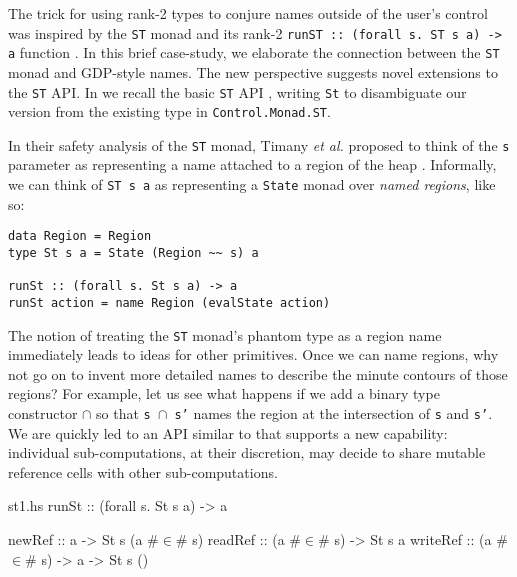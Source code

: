 \documentclass[format=sigplan, review=false, screen=true]{acmart}
\makeatletter
\let\origsection\section
\renewcommand\section{\@ifstar{\starsection}{\nostarsection}}
\newcommand\nostarsection[1]
{\sectionprelude\origsection{#1}\sectionpostlude}
\newcommand\starsection[1]
{\sectionprelude\origsection*{#1}\sectionpostlude}
\newcommand\sectionprelude{%
  \vspace{-0.5em}
}
\newcommand\sectionpostlude{%
  \vspace{0em}
}
\makeatother
\begin{document}

\section{Case Study \#2: Sharing state threads}
The trick for using rank-2 types to conjure names outside of the user's control was
inspired by the \texttt{ST} monad and its rank-2 \texttt{runST :: (forall s. ST s a) -> a}
function \cite{launchbury1994lazy}. In this brief case-study, we elaborate the connection
between the \texttt{ST} monad and GDP-style names. The new perspective suggests novel
extensions to the \texttt{ST} API.
In  we recall the basic \texttt{ST} API \cite{launchbury1994lazy}, writing \texttt{St} to
disambiguate our version from the existing type in \texttt{Control.Monad.ST}.

In their safety analysis of the \texttt{ST} monad, Timany \textit{et al.} proposed to think of the \texttt{s} parameter as
representing a name attached to a region of the heap \cite{timany2017logical}.
Informally, we can think of \texttt{ST s a} as representing a \texttt{State} monad over
\emph{named regions}, like so:
\begin{verbatim}
data Region = Region
type St s a = State (Region ~~ s) a

runSt :: (forall s. St s a) -> a
runSt action = name Region (evalState action)
\end{verbatim}

The notion of treating the \texttt{ST} monad's phantom type as a region name immediately leads to ideas for
other primitives. Once we can name regions, why not go on to invent more detailed names to describe
the minute contours of those regions? For example, let us see what happens if we add a binary type constructor $\cap$ so that \texttt{s $\cap$ s'}
names the region at the intersection of \texttt{s} and \texttt{s'}. We are quickly led to an API similar to  that
supports a new capability: individual sub-computations, at their discretion, may decide to share mutable reference cells with other sub-computations.



\begin{filecontents*}{st1.hs}
runSt    :: (forall s. St s a) -> a

newRef   :: a -> St s (a #$\in$# s)
readRef  :: (a #$\in$# s) -> St s a
writeRef :: (a #$\in$# s) -> a -> St s ()
\end{filecontents*}
\end{document}
